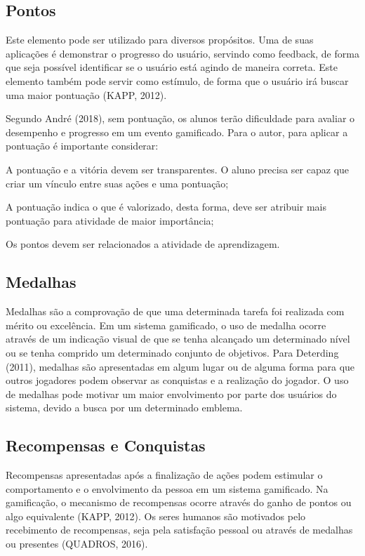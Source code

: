 \documentclass[
	12pt,				%
	oneside,			%
	a4paper,			%
	english,			%
	french,				%
	spanish,			%
	brazil,				%
	]{abntex2}
\begin{document}
\subsection{Pontos}

Este elemento pode ser utilizado para diversos propósitos. Uma de suas aplicações é demonstrar o progresso do usuário, servindo como feedback, de forma que seja possível identificar se o usuário está agindo de maneira correta. Este elemento também pode servir como estímulo, de forma que o usuário irá buscar uma maior pontuação (KAPP, 2012). 

Segundo André (2018), sem pontuação, os alunos terão dificuldade para avaliar o desempenho e progresso em um evento gamificado. Para o autor, para aplicar a pontuação é importante considerar:

A pontuação e a vitória devem ser transparentes. O aluno precisa ser capaz que criar um vínculo entre suas ações e uma pontuação;

A pontuação indica o que é valorizado, desta forma, deve ser atribuir mais pontuação para atividade de maior importância;

Os pontos devem ser relacionados a atividade de aprendizagem.

\subsection{Medalhas}

Medalhas são a comprovação de que uma determinada tarefa foi realizada com mérito ou excelência. Em um sistema gamificado, o uso de medalha ocorre através de um indicação visual de que se tenha alcançado um determinado nível ou se tenha comprido um determinado conjunto de objetivos. Para Deterding (2011), medalhas são apresentadas em algum lugar ou de alguma forma para que outros jogadores podem observar as conquistas e a realização do jogador. O uso de medalhas pode motivar um maior envolvimento por parte dos usuários do sistema, devido a busca por um determinado emblema.
    
\subsection{Recompensas e Conquistas}    

Recompensas apresentadas após a finalização de ações podem estimular o comportamento e o envolvimento da pessoa em um sistema gamificado. Na gamificação, o mecanismo de recompensas ocorre através do ganho de pontos ou algo equivalente (KAPP, 2012). Os seres humanos são motivados pelo recebimento de recompensas, seja pela satisfação pessoal ou através de medalhas ou presentes (QUADROS, 2016).
\end{document}
